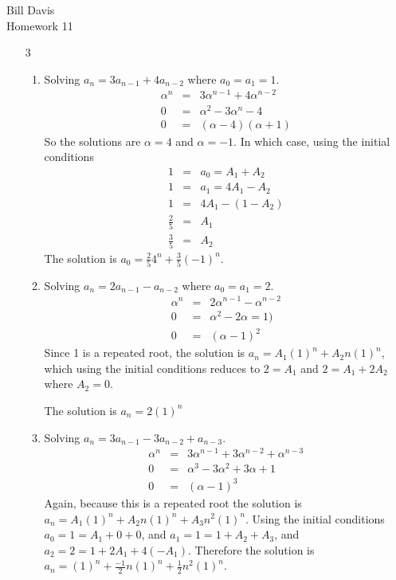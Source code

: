 \documentclass{article}
\begin{document}
Bill Davis\\
Homework 11

\begin{enumerate}

\item[3]
\begin{enumerate}
 \item %
    Solving $a_n=3a_{n-1} + 4a_{n-2}$ where $a_0=a_1=1$. 
\begin{eqnarray}
\alpha^n &=& 3\alpha^{n-1} + 4\alpha^{n-2} \\
 0 &=& \alpha^2 - 3\alpha^{n} - 4 \\
0 &=& (\alpha-4)(\alpha+1) 
\end{eqnarray}
So the solutions are $\alpha=4$ and $\alpha=-1$. In which case, using the initial conditions
\begin{eqnarray}
1 &=& a_0 = A_1+A_2 \\
1 &=& a_1 = 4A_1 - A_2 \\
1 &=& 4A_1 - (1-A_2) \\
\frac{2}{5} &=& A_1 \\
\frac{3}{5} &=& A_2 
\end{eqnarray}
The solution is $a_0 = \frac{2}{5}4^n+\frac{3}{5}(-1)^n. $
 \item %
Solving $a_n = 2a_{n-1} -a_{n-2} $ where $a_0=a_1=2$. 
\begin{eqnarray}
\alpha^n &=& 2\alpha^{n-1} - \alpha^{n-2} \\
0 &=& \alpha^2-2\alpha=1) \\
0 &=& (\alpha-1)^2
\end{eqnarray}
Since 1 is a repeated root, the solution is $a_n = A_1(1)^n + A_2n(1)^n$, which using the initial conditions reduces to $2=A_1$ and $2=A_1+2A_2$ where $A_2=0$. 

The solution is $a_n=2(1)^n$
 \item %
Solving $a_n = 3a_{n-1} - 3a_{n-2} +a_{n-3}$. 
\begin{eqnarray} 
\alpha^n &=& 3\alpha^{n-1} + 3\alpha^{n-2} + \alpha^{n-3} \\
0 &=& \alpha^3 - 3\alpha^2 + 3\alpha + 1 \\
0 &=& (\alpha-1)^3
\end{eqnarray}
Again, because this is a repeated root the solution is $a_n = A_1(1)^n + A_2n(1)^n + A_3n^2(1)^n$. 
Using the initial conditions $a_0 = 1 = A_1 + 0 + 0$, and $a_1 = 1 = 1 + A_2 + A_3$, and $a_2 = 2 = 1+2A_1 + 4(-A_1)$. Therefore the solution is $a_n = (1)^n + \frac{-1}{2}n(1)^n + \frac{1}{2}n^2(1)^n$.
\end{enumerate}


\end{enumerate}
\end{document}
